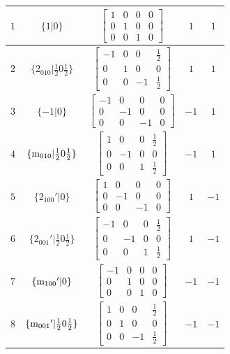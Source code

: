 \documentclass[fleqn,8pt]{jsarticle}
\begin{document}
\begin{longtable}{ccccc}
$ 1 $ & $ \{1|0\} $ & $ \begin{bmatrix} 1 & 0 & 0 & 0 \\ 0 & 1 & 0 & 0 \\ 0 & 0 & 1 & 0 \end{bmatrix} $ & $ 1 $ & $ 1 $ \\ \hline
$ 2 $ & $ \{2{}_{010}|\frac{1}{2} 0 \frac{1}{2}\} $ & $ \begin{bmatrix} -1 & 0 & 0 & \frac{1}{2} \\ 0 & 1 & 0 & 0 \\ 0 & 0 & -1 & \frac{1}{2} \end{bmatrix} $ & $ 1 $ & $ 1 $ \\ \hline
$ 3 $ & $ \{-1|0\} $ & $ \begin{bmatrix} -1 & 0 & 0 & 0 \\ 0 & -1 & 0 & 0 \\ 0 & 0 & -1 & 0 \end{bmatrix} $ & $ -1 $ & $ 1 $ \\ \hline
$ 4 $ & $ \{{\rm m}_{010}|\frac{1}{2} 0 \frac{1}{2}\} $ & $ \begin{bmatrix} 1 & 0 & 0 & \frac{1}{2} \\ 0 & -1 & 0 & 0 \\ 0 & 0 & 1 & \frac{1}{2} \end{bmatrix} $ & $ -1 $ & $ 1 $ \\ \hline
$ 5 $ & $ \{2{}_{100}{}'|0\} $ & $ \begin{bmatrix} 1 & 0 & 0 & 0 \\ 0 & -1 & 0 & 0 \\ 0 & 0 & -1 & 0 \end{bmatrix} $ & $ 1 $ & $ -1 $ \\ \hline
$ 6 $ & $ \{2{}_{001}{}'|\frac{1}{2} 0 \frac{1}{2}\} $ & $ \begin{bmatrix} -1 & 0 & 0 & \frac{1}{2} \\ 0 & -1 & 0 & 0 \\ 0 & 0 & 1 & \frac{1}{2} \end{bmatrix} $ & $ 1 $ & $ -1 $ \\ \hline
$ 7 $ & $ \{{\rm m}_{100}{}'|0\} $ & $ \begin{bmatrix} -1 & 0 & 0 & 0 \\ 0 & 1 & 0 & 0 \\ 0 & 0 & 1 & 0 \end{bmatrix} $ & $ -1 $ & $ -1 $ \\ \hline
$ 8 $ & $ \{{\rm m}_{001}{}'|\frac{1}{2} 0 \frac{1}{2}\} $ & $ \begin{bmatrix} 1 & 0 & 0 & \frac{1}{2} \\ 0 & 1 & 0 & 0 \\ 0 & 0 & -1 & \frac{1}{2} \end{bmatrix} $ & $ -1 $ & $ -1 $ \\ \hline

\end{longtable}
\end{document}

